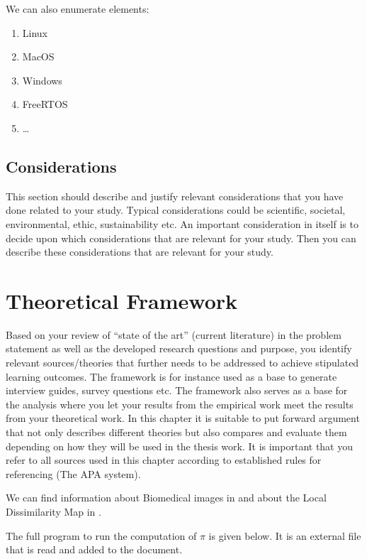 \documentclass[a4paper, 12pt]{report}
\begin{document}
We can also enumerate elements:

\begin{enumerate}
  \item Linux
  \item MacOS
  \item Windows
  \item FreeRTOS
  \item\dots
\end{enumerate}

\section{Considerations}

\textcolor{jupurple}{
This section should describe and justify relevant considerations that you have done related to your study. Typical considerations could be scientific, societal, environmental, ethic, sustainability etc. An important consideration in itself is to decide upon which considerations that are relevant for your study. Then you can describe these considerations that are relevant for your study.
}


\chapter{Theoretical Framework}
\label{sec:theory}

\textcolor{jupurple}{
Based on your review of “state of the art” (current literature) in the problem statement as well as the developed research questions and purpose, you identify relevant sources/theories that further needs to be addressed to achieve stipulated learning outcomes. The framework is for instance used as a base to generate interview guides, survey questions etc. The framework also serves as a base for the analysis where you let your results from the empirical work meet the results from your theoretical work. 
In this chapter it is suitable to put forward argument that not only describes different theories but also compares and evaluate them depending on how they will be used in the thesis work. It is important that you refer to all sources used in this chapter according to established rules for referencing (The APA system).
}

\medskip
We can find information about Biomedical images in \parencite{5464359} and about the Local Dissimilarity Map in \parencite{9928253}.

The full program to run the computation of $\pi$ is given below. It is an external file that is read and added to the document.
\end{document}
